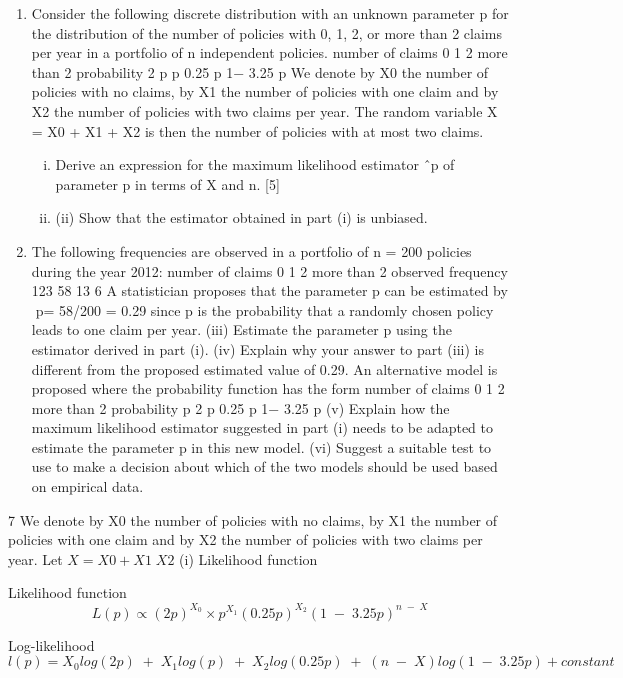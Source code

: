\documentclass[a4paper,12pt]{article}
\begin{document}
\begin{enumerate}
\item Consider the following discrete distribution with an unknown parameter p for the
distribution of the number of policies with 0, 1, 2, or more than 2 claims per year in a
portfolio of n independent policies.
number of claims 0 1 2 more than 2
probability 2 p p 0.25 p 1− 3.25 p
We denote by X0 the number of policies with no claims, by X1 the number of policies
with one claim and by X2 the number of policies with two claims per year. The
random variable X = X0 + X1 + X2 is then the number of policies with at most two
claims.
\begin{enumerate}[(i)]
\item  Derive an expression for the maximum likelihood estimator ˆp of parameter p
in terms of X and n. [5]
\item (ii) Show that the estimator obtained in part (i) is unbiased. 
\end{enumerate}
\item 
The following frequencies are observed in a portfolio of n = 200 policies during the
year 2012:
  number of claims 0 1 2 more than 2
observed frequency 123 58 13 6
A statistician proposes that the parameter p can be estimated by 􀀄p= 58/200 = 0.29
since p is the probability that a randomly chosen policy leads to one claim per year.
(iii) Estimate the parameter p using the estimator derived in part (i). 
(iv) Explain why your answer to part (iii) is different from the proposed estimated
value of 0.29. 
An alternative model is proposed where the probability function has the form
number of claims 0 1 2 more than 2
probability p 2 p 0.25 p 1− 3.25 p
(v) Explain how the maximum likelihood estimator suggested in part (i) needs to
be adapted to estimate the parameter p in this new model. 
(vi) Suggest a suitable test to use to make a decision about which of the two
models should be used based on empirical data. 
\end{enumerate}
\newpage


7 We denote by X0 the number of policies with no claims, by X1 the number of
policies with one claim and by X2 the number of policies with two claims per year.
Let $X = X0 + X1  X2$
(i) Likelihood function

Likelihood function
\[
L ( p ) \propto ( 2 p )^{X_0} \times p^{X_1} ( 0.25 p )^{X_2}( 1 \;-\; 3.25 p )^{ n \;-\; X}
\]

Log-likelihood
\[
l ( p ) = X_0 log ( 2 p ) \;+\; X_1 log ( p ) \;+\; X_2 log ( 0.25 p ) \;+\; ( n \;-\; X ) log ( 1 \;-\; 3.25 p )
+ constant
\]
\end{document}
